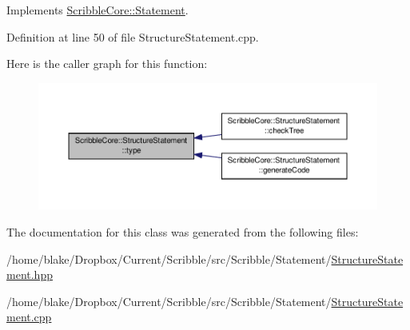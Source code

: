 Implements \hyperlink{class_scribble_core_1_1_statement_a532ed5a44ec49873dc191dae7ddc8b00}{Scribble\-Core\-::\-Statement}.



Definition at line 50 of file Structure\-Statement.\-cpp.



Here is the caller graph for this function\-:
\nopagebreak
\begin{figure}[H]
\begin{center}
\leavevmode
\includegraphics[width=350pt]{class_scribble_core_1_1_structure_statement_af079e625c1bfe690339c0b4922dd152c_icgraph}
\end{center}
\end{figure}




The documentation for this class was generated from the following files\-:\begin{DoxyCompactItemize}
\item 
/home/blake/\-Dropbox/\-Current/\-Scribble/src/\-Scribble/\-Statement/\hyperlink{_structure_statement_8hpp}{Structure\-Statement.\-hpp}\item 
/home/blake/\-Dropbox/\-Current/\-Scribble/src/\-Scribble/\-Statement/\hyperlink{_structure_statement_8cpp}{Structure\-Statement.\-cpp}\end{DoxyCompactItemize}
